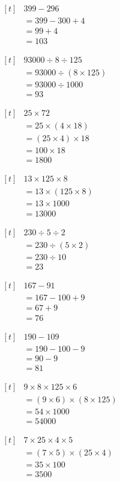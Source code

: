 \documentclass[UTF8]{ctexart}
\newcommand{\cell}[1]{%
  \begin{minipage}[t][49mm][t]{0.315\textwidth}%
    \vspace{0pt}%
    \linespread{1}\zihao{3}%
    #1%
  \end{minipage}%
}
\newcommand{\sheetrow}[3]{%
  \noindent\cell{#1}\hfill\cell{#2}\hfill\cell{#3}\par
  \nointerlineskip
}
\begin{document}
\sheetrow
{\(\begin{aligned}[t]
& 399-296 \\
& = 399-300+4 \\
& = 99+4 \\
& = 103
\end{aligned}\)}
{\(\begin{aligned}[t]
& 93000\div 8\div 125 \\
& = 93000\div (8\times 125) \\
& = 93000\div 1000 \\
& = 93
\end{aligned}\)}
{\(\begin{aligned}[t]
& 25\times 72 \\
& = 25\times (4\times 18) \\
& = (25\times 4)\times 18 \\
& = 100\times 18 \\
& = 1800
\end{aligned}\)}
\sheetrow
{\(\begin{aligned}[t]
& 13\times 125\times 8 \\
& = 13\times (125\times 8) \\
& = 13\times 1000 \\
& = 13000
\end{aligned}\)}
{\(\begin{aligned}[t]
& 230\div 5\div 2 \\
& = 230\div (5\times 2) \\
& = 230\div 10 \\
& = 23
\end{aligned}\)}
{\(\begin{aligned}[t]
& 167-91 \\
& = 167-100+9 \\
& = 67+9 \\
& = 76
\end{aligned}\)}
\sheetrow
{\(\begin{aligned}[t]
& 190-109 \\
& = 190-100-9 \\
& = 90-9 \\
& = 81
\end{aligned}\)}
{\(\begin{aligned}[t]
& 9\times 8\times 125\times 6 \\
& = (9\times 6)\times (8\times 125) \\
& = 54\times 1000 \\
& = 54000
\end{aligned}\)}
{\(\begin{aligned}[t]
& 7\times 25\times 4\times 5 \\
& = (7\times 5)\times (25\times 4) \\
& = 35\times 100 \\
& = 3500
\end{aligned}\)}
\end{document}
